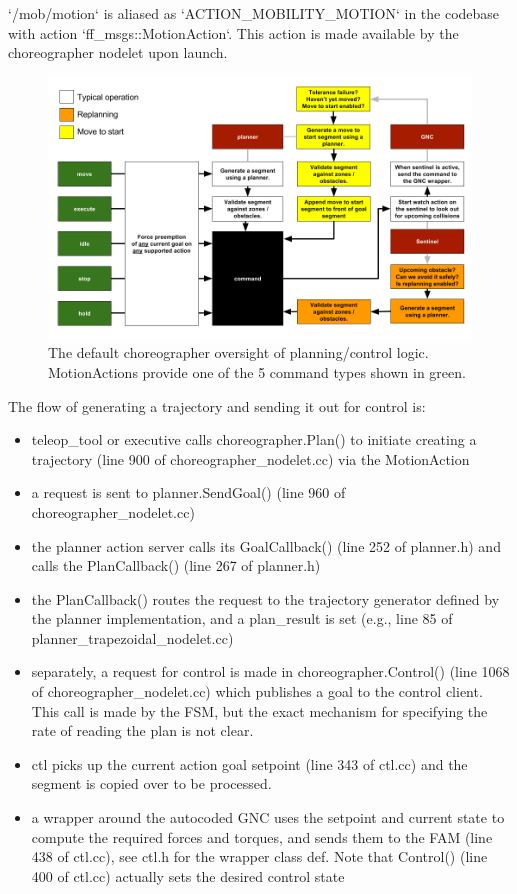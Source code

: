 \documentclass{article}
\begin{document}
\begin{markdown}
`/mob/motion` is aliased as `ACTION_MOBILITY_MOTION` in the codebase with action `ff_msgs::MotionAction`. This action is made available by the choreographer nodelet upon launch.
\end{markdown}

\begin{figure}[h!]
	\centering
	\includegraphics[width=1.0\textwidth]{img/choreographer.png}
	\caption{The default choreographer oversight of planning/control logic. MotionActions provide one of the 5 command types shown in green.}
\end{figure}

The flow of generating a trajectory and sending it out for control is:
\begin{itemize}
	\item teleop\_tool or executive calls choreographer.Plan() to initiate creating a trajectory (line 900 of choreographer\_nodelet.cc) via the MotionAction
	\item a request is sent to planner.SendGoal() (line 960 of choreographer\_nodelet.cc)
	\item the planner action server calls its GoalCallback() (line 252 of planner.h) and calls the PlanCallback() (line 267 of planner.h)
	\item the PlanCallback() routes the request to the trajectory generator defined by the planner implementation, and a plan\_result is set (e.g., line 85 of planner\_trapezoidal\_nodelet.cc)
	\item separately, a request for control is made in choreographer.Control() (line 1068 of choreographer\_nodelet.cc) which publishes a goal to the control client. This call is made by the FSM, but the exact mechanism for specifying the rate of reading the plan is not clear.
	\item ctl picks up the current action goal setpoint (line 343 of ctl.cc) and the segment is copied over to be processed.
	\item a wrapper around the autocoded GNC uses the setpoint and current state to compute the required forces and torques, and sends them to the FAM (line 438 of ctl.cc), see ctl.h for the wrapper class def. Note that Control() (line 400 of ctl.cc) actually sets the desired control state
\end{itemize}
\end{document}
